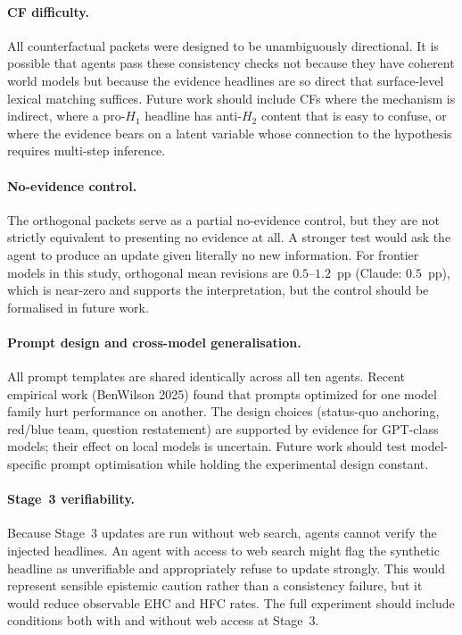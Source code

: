 \documentclass{article} %
\begin{document}
\paragraph{CF difficulty.}
All counterfactual packets were designed to be unambiguously directional.  It is possible
that agents pass these consistency checks not because they have coherent world models
but because the evidence headlines are so direct that surface-level lexical matching
suffices.  Future work should include CFs where the mechanism is indirect, where a
pro-$H_1$ headline has anti-$H_2$ content that is easy to confuse, or where the evidence
bears on a latent variable whose connection to the hypothesis requires multi-step
inference.

\paragraph{No-evidence control.}
The orthogonal packets serve as a partial no-evidence control, but they are not strictly
equivalent to presenting no evidence at all.  A stronger test would ask the agent to
produce an update given literally no new information.  For frontier models in this study,
orthogonal mean revisions are $0.5$--$1.2$~pp (Claude: $0.5$~pp), which is near-zero
and supports the interpretation, but the control should be formalised in future work.

\paragraph{Prompt design and cross-model generalisation.}
All prompt templates are shared identically across all ten agents.  Recent empirical
work (BenWilson 2025) found that prompts optimized for one model family hurt performance
on another.  The design choices (status-quo anchoring, red/blue team, question
restatement) are supported by evidence for GPT-class models; their effect on local
models is uncertain.  Future work should test model-specific prompt optimisation while
holding the experimental design constant.

\paragraph{Stage~3 verifiability.}
Because Stage~3 updates are run without web search, agents cannot verify the injected
headlines.  An agent with access to web search might flag the synthetic headline as
unverifiable and appropriately refuse to update strongly.  This would represent sensible
epistemic caution rather than a consistency failure, but it would reduce observable EHC
and HFC rates.  The full experiment should include conditions both with and without web
access at Stage~3.
\end{document}
